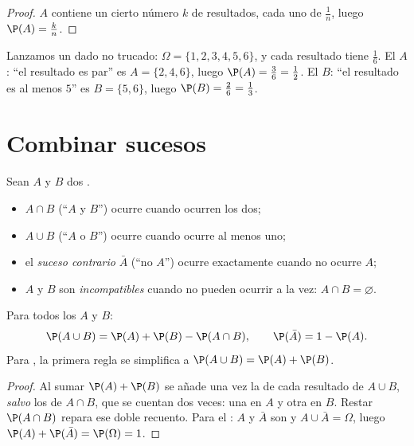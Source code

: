 \begin{proof}
$A$ contiene un cierto número $k$ de resultados, cada uno de 
$\frac1n$, luego $\P(A) = \frac kn$.
\end{proof}

\begin{example}\label{ex:g10:proba:die}
Lanzamos un dado no trucado: $\Omega = \{1, 2, 3, 4, 5, 6\}$, y cada
resultado tiene  $\frac16$. El  $A$: ``el resultado es
par'' es $A = \{2, 4, 6\}$, luego $\P(A) = \frac36 = \frac12$. El 
$B$: ``el resultado es al menos $5$'' es $B = \{5, 6\}$, luego
$\P(B) = \frac26 = \frac13$.
\end{example}

\section{Combinar sucesos}

\begin{definition}\label{def:g10:proba:operations}
Sean $A$ y $B$ dos .
\begin{itemize}
  \item $A \cap B$ (``$A$ y $B$'') ocurre cuando ocurren los dos;
  \item $A \cup B$ (``$A$ o $B$'') ocurre cuando ocurre al menos uno;
  \item el \emph{suceso contrario} $\bar A$ (``no
        $A$'') ocurre exactamente cuando no ocurre $A$;
  \item $A$ y $B$ son \emph{incompatibles}
        cuando no pueden ocurrir a la vez: $A \cap B = \varnothing$.
\end{itemize}
\end{definition}

\begin{theorem}\label{thm:g10:proba:addition}
Para todos los  $A$ y $B$:
\[
\P(A \cup B) = \P(A) + \P(B) - \P(A \cap B),
\qquad
\P(\bar A) = 1 - \P(A) .
\]
Para , la primera regla se simplifica a
$\P(A \cup B) = \P(A) + \P(B)$.
\end{theorem}

\begin{proof}
Al sumar $\P(A) + \P(B)$ se añade una vez la  de cada
resultado de $A \cup B$, \emph{salvo} los de $A \cap B$, que se cuentan
dos veces: una en $A$ y otra en $B$. Restar $\P(A \cap B)$ repara ese
doble recuento. Para el : $A$ y $\bar A$ son
 y $A \cup \bar A = \Omega$, luego
$\P(A) + \P(\bar A) = \P(\Omega) = 1$.
\end{proof}

